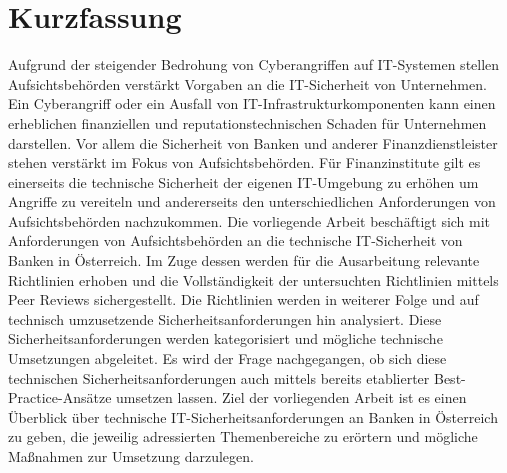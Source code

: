 \chapter{Kurzfassung}
Aufgrund der steigender Bedrohung von Cyberangriffen auf IT-Systemen stellen Aufsichtsbehörden verstärkt Vorgaben an die IT-Sicherheit von Unternehmen. Ein Cyberangriff oder ein Ausfall von IT-Infrastrukturkomponenten kann einen erheblichen finanziellen und reputationstechnischen Schaden für Unternehmen darstellen. Vor allem die Sicherheit von Banken und anderer Finanzdienstleister stehen verstärkt im Fokus von Aufsichtsbehörden. Für Finanzinstitute gilt es einerseits die technische Sicherheit der eigenen IT-Umgebung zu erhöhen um Angriffe zu vereiteln und andererseits den unterschiedlichen Anforderungen von Aufsichtsbehörden nachzukommen. Die vorliegende Arbeit beschäftigt sich mit Anforderungen von Aufsichtsbehörden an die technische IT-Sicherheit von Banken in Österreich. Im Zuge dessen werden für die Ausarbeitung relevante Richtlinien erhoben und die Vollständigkeit der untersuchten Richtlinien mittels Peer Reviews sichergestellt. Die Richtlinien werden in weiterer Folge und auf technisch umzusetzende Sicherheitsanforderungen hin analysiert. Diese Sicherheitsanforderungen werden kategorisiert und mögliche technische Umsetzungen abgeleitet. Es wird der Frage nachgegangen, ob sich diese technischen Sicherheitsanforderungen auch mittels bereits etablierter Best-Practice-Ansätze umsetzen lassen. Ziel der vorliegenden Arbeit ist es einen Überblick über technische IT-Sicherheitsanforderungen an Banken in Österreich zu geben, die jeweilig adressierten Themenbereiche zu erörtern und mögliche Maßnahmen zur Umsetzung darzulegen.